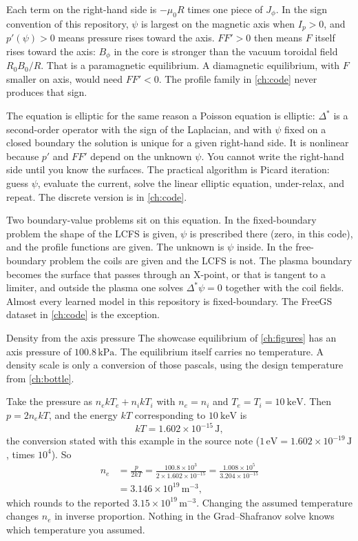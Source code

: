 \documentclass[11pt,a4paper,oneside,openany]{book}
\numberwithin{equation}{chapter}
\newcommand{\Dstar}{\Delta^{*}}
\newcommand{\Ip}{I_{p}}
\theoremstyle{definition}
\begin{document}
Each term on the right-hand side is \(-\mu_{0} R\) times one piece of \(J_{\phi}\). In the sign convention of this repository, \(\psi\) is largest on the magnetic axis when \(\Ip>0\), and \(p'(\psi)>0\) means pressure rises toward the axis. \(FF'>0\) then means \(F\) itself rises toward the axis: \(B_{\phi}\) in the core is stronger than the vacuum toroidal field \(R_{0} B_{0}/R\). That is a paramagnetic equilibrium. A diamagnetic equilibrium, with \(F\) smaller on axis, would need \(FF'<0\). The profile family in \cref{ch:code} never produces that sign.

The equation is elliptic for the same reason a Poisson equation is elliptic: \(\Dstar\) is a second-order operator with the sign of the Laplacian, and with \(\psi\) fixed on a closed boundary the solution is unique for a given right-hand side. It is nonlinear because \(p'\) and \(FF'\) depend on the unknown \(\psi\). You cannot write the right-hand side until you know the surfaces. The practical algorithm is Picard iteration: guess \(\psi\), evaluate the current, solve the linear elliptic equation, under-relax, and repeat. The discrete version is in \cref{ch:code}.

Two boundary-value problems sit on this equation. In the fixed-boundary problem the shape of the LCFS is given, \(\psi\) is prescribed there (zero, in this code), and the profile functions are given. The unknown is \(\psi\) inside. In the free-boundary problem the coils are given and the LCFS is not. The plasma boundary becomes the surface that passes through an X-point, or that is tangent to a limiter, and outside the plasma one solves \(\Dstar\psi=0\) together with the coil fields. Almost every learned model in this repository is fixed-boundary. The FreeGS dataset in \cref{ch:code} is the exception.

\begin{worked}{Density from the axis pressure}
\label{ex:density}
The showcase equilibrium of \cref{ch:figures} has an axis pressure of \(100.8\,\mathrm{kPa}\). The equilibrium itself carries no temperature. A density scale is only a conversion of those pascals, using the design temperature from \cref{ch:bottle}.

Take the pressure as \(n_{e} k T_{e}+n_{i} k T_{i}\) with \(n_{e}=n_{i}\) and \(T_{e}=T_{i}=\qty{10}{\kilo\electronvolt}\). Then \(p=2 n_{e} k T\), and the energy \(k T\) corresponding to \(\qty{10}{\kilo\electronvolt}\) is
\[
k T=1.602\times 10^{-15}\,\mathrm{J},
\]
the conversion stated with this example in the source note (\(1\,\mathrm{eV}=1.602\times 10^{-19}\,\mathrm{J}\), times \(10^{4}\)). So
\begin{align*}
n_{e}
&=\frac{p}{2 k T}
=\frac{100.8\times 10^{3}}{2\times 1.602\times 10^{-15}}
=\frac{1.008\times 10^{5}}{3.204\times 10^{-15}}\\
&=3.146\times 10^{19}\,\mathrm{m}^{-3},
\end{align*}
which rounds to the reported \(3.15\times 10^{19}\,\mathrm{m}^{-3}\). Changing the assumed temperature changes \(n_{e}\) in inverse proportion. Nothing in the Grad--Shafranov solve knows which temperature you assumed.
\end{worked}
\end{document}
